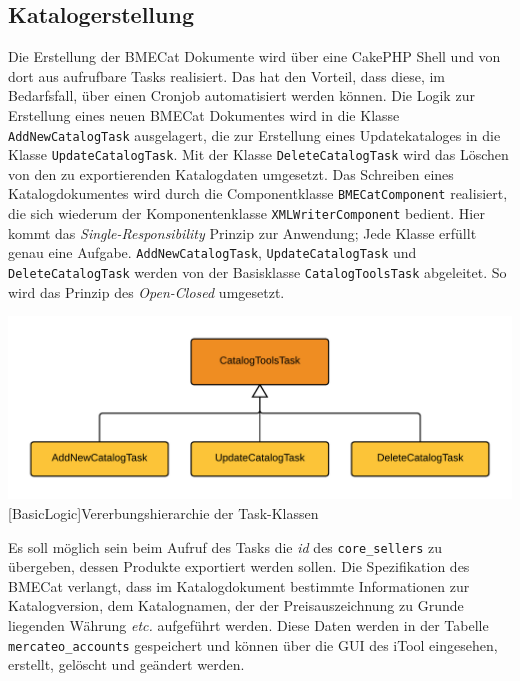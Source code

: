 	\subsection{Katalogerstellung}
	
	Die Erstellung der BMECat Dokumente wird über eine CakePHP Shell und von dort aus aufrufbare Tasks realisiert. Das hat den Vorteil, dass diese, im Bedarfsfall, über einen Cronjob automatisiert werden können.
	Die Logik zur Erstellung eines neuen BMECat Dokumentes wird in die Klasse \texttt{AddNewCatalogTask} ausgelagert, die zur Erstellung eines Updatekataloges in die Klasse 
	\texttt{UpdateCatalogTask}. Mit der Klasse \texttt{DeleteCatalogTask} wird das Löschen von den zu exportierenden Katalogdaten umgesetzt. Das Schreiben eines Katalogdokumentes wird durch die Componentklasse \texttt{BMECatComponent} realisiert, die sich wiederum der Komponentenklasse \texttt{XMLWriterComponent} bedient. Hier kommt das \textit{Single-Responsibility} Prinzip zur Anwendung; Jede Klasse erfüllt genau eine Aufgabe. \texttt{AddNewCatalogTask}, \texttt{UpdateCatalogTask} und \texttt{DeleteCatalogTask} werden von der Basisklasse \texttt{CatalogToolsTask} abgeleitet. So wird das Prinzip des \textit{Open-Closed} umgesetzt.

	\begin{minipage}{\linewidth}
		\vspace{1em}
		\centering
		\includegraphics[width=0.7 \linewidth]{img/VererbungShellSimple}
		[BasicLogic]{Vererbungshierarchie der Task-Klassen}
		\vspace{1em}
	\end{minipage}	
	
	Es soll möglich sein beim Aufruf des Tasks die \textit{id} des \texttt{core\_sellers} zu übergeben, dessen Produkte exportiert werden sollen. Die Spezifikation des BMECat verlangt, dass im Katalogdokument bestimmte Informationen zur Katalogversion, dem Katalognamen, der der Preisauszeichnung zu Grunde liegenden Währung \textit{etc.} aufgeführt werden. Diese Daten werden in der Tabelle \texttt{mercateo\_accounts} gespeichert und können über die GUI des iTool eingesehen, erstellt, gelöscht und geändert werden.\\
	
